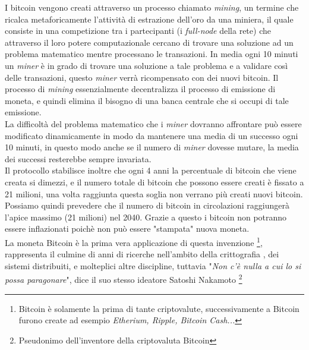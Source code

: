 I bitcoin vengono creati attraverso un processo chiamato \textit{mining}, un termine che ricalca metaforicamente l'attivit\`a di estrazione dell'oro da una miniera, il quale consiste in una competizione tra i partecipanti (i \textit{full-node} della rete) che attraverso il loro potere computazionale cercano di trovare una soluzione ad un problema matematico mentre processano le transazioni. In media ogni 10 minuti un \textit{miner} \`e in grado di trovare una soluzione a tale problema e a validare cos\`i delle transazioni, questo \textit{miner} verr\`a ricompensato con dei nuovi bitcoin. Il processo di \textit{mining} essenzialmente decentralizza il processo di emissione di moneta, e quindi elimina il bisogno di una banca centrale che si occupi di tale emissione.\\
La difficolt\`a del problema matematico che i \textit{miner} dovranno affrontare pu\`o essere modificato dinamicamente in modo da mantenere una media di un successo ogni 10 minuti, in questo modo anche se il numero di \textit{miner} dovesse mutare, la media dei successi resterebbe sempre invariata.\\
Il protocollo stabilisce inoltre che ogni 4 anni la percentuale di bitcoin che viene creata si dimezzi, e il numero totale di bitcoin che possono essere creati \`e fissato a 21 milioni, una volta raggiunta questa soglia non verrano pi\`u creati nuovi bitcoin. Possiamo quindi prevedere che il numero di bitcoin in circolazioni raggiunger\`a l'apice massimo (21 milioni) nel 2040. Grazie a questo i bitcoin non potranno essere inflazionati poich\`e non pu\`o essere "stampata" nuova moneta.\\
La moneta Bitcoin \`e la prima vera applicazione di questa invenzione \footnote{Bitcoin \`e solamente la prima di tante criptovalute, successivamente a Bitcoin furono create ad esempio \textit{Etherium, Ripple, Bitcoin Cash...}}, rappresenta il culmine di anni di ricerche nell'ambito della crittografia , dei sistemi distribuiti, e molteplici altre discipline, tuttavia "\textit{Non c'\`e nulla a cui lo
si possa paragonare}", dice il suo stesso ideatore Satoshi Nakamoto \footnote{Pseudonimo dell'inventore della criptovaluta Bitcoin }

